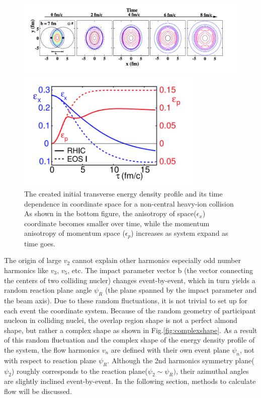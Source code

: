  	
\begin{figure}[t]
\centerline{\includegraphics[width=12.0cm]{figures/system_time_flow}}
\centerline{\includegraphics[width=9.0cm]{figures/time_ecenx_ecenp}}
\caption{The created initial transverse energy density profile and its time
dependence in coordinate space for a non-central heavy-ion collision \cite{Kolb:2003dz} As shown in the bottom figure, the anisotropy of space($\epsilon_x$) coordinate becomes smaller over time, while the momentum anisotropy of momentum space ($\epsilon_p$) increases as system expand as time goes. }
\label{fig4}
\end{figure}


	The origin of large $v_2$ cannot explain other harmonics especially odd number harmonics like $v_3$, $v_5$, etc. The impact parameter vector b (the vector connecting the centers of two colliding nucler) changes event-by-event, which in turn yields a random reaction plane angle $\psi_R$ (the plane spanned by the impact parameter and the beam axis). Due to these random fluctuations, it is not trivial to set up for each event the coordinate system. Because of the random geometry of participant nucleon in colliding nuclei, the overlap region shape is not a perfect almond shape, but rather a complex shape as shown in Fig.\ref{fig:complexshape}. As a result of this random fluctuation and the complex shape of the energy density profile of the system, the flow harmonics $v_n$ are defined with their own event plane $\psi_n$, not with respect to reaction plane $\psi_R$. Although the 2nd harmonics symmetry plane($\psi_2$) roughly corresponds to the reaction plane($\psi_2 \sim \psi_R)$, their azimuthal angles are slightly inclined event-by-event. In the following section, methods to calculate flow will be discussed.
		


